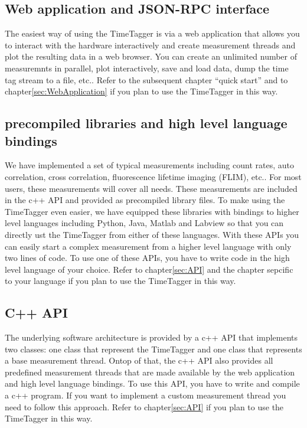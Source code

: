 \documentclass[oneside]{memoir}
\begin{document}
\subsection{Web application and JSON-RPC interface}
The easiest way of using the TimeTagger is via a web application
that allows you to interact with the hardware interactively and create
measurement threads and plot the resulting data in a web browser.
You can create an unlimited number of measuremnts
in parallel, plot interactively, save and load data, dump the time tag
stream to a file, etc.. Refer to the subsequent chapter ``quick start'' and
to chapter\ref{sec:WebApplication} if you plan to use the TimeTagger in this
way.

\subsection{precompiled libraries and high level language bindings}
We have implemented a set of typical measurements including count rates, auto
correlation, cross correlation, fluorescence lifetime imaging (FLIM), etc..
For most users, these measurements
will cover all needs. These measurements are included in
the c++ API and provided as precompiled library files. To make using the
TimeTagger even easier, we have equipped these libraries with
bindings to higher level languages including Python, Java, Matlab and Labview
so that you can directly ust the TimeTagger from either of these languages.
With these APIs you can easily start a complex
measurement from a higher level language with only two lines of code. 
To use one of these APIs, you have to write code in the high
level language of your choice. Refer to chapter\ref{sec:API} and the chapter
sepcific to your language if you plan to use the TimeTagger
in this way. 

\subsection{C++ API}
The underlying software architecture is provided by a c++ API that implements
two classes: one class that represent the TimeTagger and one class that
represents a base measurement thread. Ontop of that, the c++ API also provides
all predefined measurement threads that are made available by the web
application and high level language bindings. To use this API, you have to
write and compile a c++ program. If you want to implement a custom
measurement thread you need to follow this approach. Refer to
chapter\ref{sec:API} if you plan to use the TimeTagger in this way.
\end{document}
